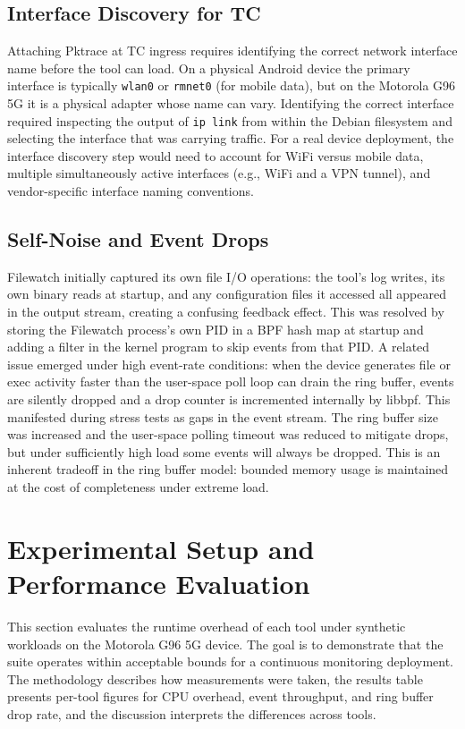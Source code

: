 \documentclass{mnitjaipur}
\begin{document}
\section{Interface Discovery for TC}
Attaching Pktrace at TC ingress requires identifying the correct network interface name before the tool can load. On a physical Android device the primary interface is typically \texttt{wlan0} or \texttt{rmnet0} (for mobile data), but on the Motorola G96 5G it is a physical adapter whose name can vary. Identifying the correct interface required inspecting the output of \texttt{ip link} from within the Debian filesystem and selecting the interface that was carrying traffic. For a real device deployment, the interface discovery step would need to account for WiFi versus mobile data, multiple simultaneously active interfaces (e.g., WiFi and a VPN tunnel), and vendor-specific interface naming conventions.

\section{Self-Noise and Event Drops}
Filewatch initially captured its own file I/O operations: the tool's log writes, its own binary reads at startup, and any configuration files it accessed all appeared in the output stream, creating a confusing feedback effect. This was resolved by storing the Filewatch process's own PID in a BPF hash map at startup and adding a filter in the kernel program to skip events from that PID. A related issue emerged under high event-rate conditions: when the device generates file or exec activity faster than the user-space poll loop can drain the ring buffer, events are silently dropped and a drop counter is incremented internally by libbpf. This manifested during stress tests as gaps in the event stream. The ring buffer size was increased and the user-space polling timeout was reduced to mitigate drops, but under sufficiently high load some events will always be dropped. This is an inherent tradeoff in the ring buffer model: bounded memory usage is maintained at the cost of completeness under extreme load.

\clearpage
\chapter{Experimental Setup and Performance Evaluation}
This section evaluates the runtime overhead of each tool under synthetic workloads on the Motorola G96 5G device. The goal is to demonstrate that the suite operates within acceptable bounds for a continuous monitoring deployment. The methodology describes how measurements were taken, the results table presents per-tool figures for CPU overhead, event throughput, and ring buffer drop rate, and the discussion interprets the differences across tools.
\end{document}
